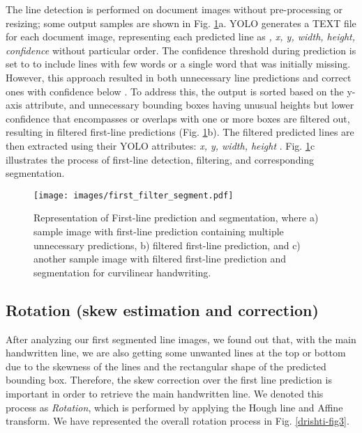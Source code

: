 \documentclass[runningheads]{llncs}
\begin{document}
The line detection is performed on document images without pre-processing or resizing; some output samples are shown in Fig. \ref{drishti-fig2}a. YOLO generates a TEXT file for each document image, representing each predicted line as \textit{, x, y, width, height, confidence} without particular order. The confidence threshold during prediction is set to  to include lines with few words or a single word that was initially missing. However, this approach resulted in both unnecessary line predictions and correct ones with confidence below . To address this, the output is sorted based on the y-axis attribute, and unnecessary bounding boxes having unusual heights but lower confidence that encompasses or overlaps with one or more boxes are filtered out, resulting in filtered first-line predictions (Fig. \ref{drishti-fig2}b). The filtered predicted lines are then extracted using their YOLO attributes: \textit{ x, y, width, height }. Fig. \ref{drishti-fig2}c illustrates the process of first-line detection, filtering, and corresponding segmentation.

\begin{figure}
\texttt{[image: images/first\_filter\_segment.pdf]}
\vspace{-4mm}
\caption{Representation of First-line prediction and segmentation, where a) sample image with first-line prediction containing multiple unnecessary predictions, b) filtered first-line prediction, and c) another sample image with filtered first-line prediction and segmentation for curvilinear handwriting.}
\label{drishti-fig2}
\vspace{-4mm}
\end{figure}


\vspace{-4mm}
\subsection{Rotation (skew estimation and correction)}
\label{sec_4_3}
After analyzing our first segmented line images, we found out that, with the main handwritten line, we are also getting some unwanted lines at the top or bottom due to the skewness of the lines and the rectangular shape of the predicted bounding box. Therefore, the skew correction over the first line prediction is important in order to retrieve the main handwritten line. We denoted this process as \textit{Rotation}, which is performed by applying the Hough line and Affine transform. We have represented the overall rotation process in Fig. \ref{drishti-fig3}.
\end{document}
